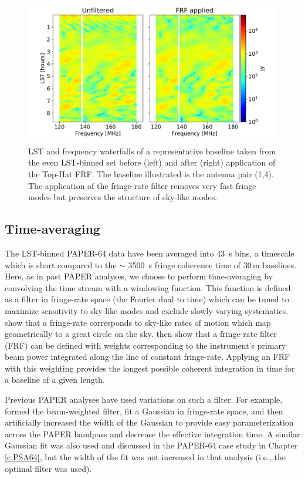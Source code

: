 \begin{figure}[tp]
\centering
\includegraphics[width=.85\textwidth]{plots/data_bl_waterfalls.pdf}
\caption{LST and frequency waterfalls of a representative
baseline taken from the even LST-binned set before (left)
and after (right) application of the Top-Hat FRF.
The baseline illustrated is the antenna pair (1,4). The application of the fringe-rate filter removes very fast
fringe modes but preserves the structure of sky-like
modes.}
\label{fig:waterfalls}
\end{figure}

\subsection{Time-averaging}

The LST-binned PAPER-64 data have been averaged into $43$~s bins, a timescale
which is short compared to the $\sim$ 3500~s fringe coherence time of 30\,m baselines.
Here, as in past PAPER analyses, we choose to perform time-averaging by convolving the time stream with a windowing function.
This function is defined as a filter in fringe-rate space
(the Fourier dual to time) which can be tuned to maximize sensitivity to sky-like modes and exclude slowly varying systematics.
\cite{parsons_backer2009} show that
a fringe-rate corresponds to sky-like rates of motion which map geometrically to
a great circle on the sky.
\cite{parsons_et_al2016} then show that a fringe-rate filter (FRF) can be defined with weights corresponding
to the instrument's primary beam power integrated along the line of constant fringe-rate. Applying an FRF with this weighting provides the longest possible coherent integration in time for a baseline of a given length.

Previous PAPER analyses have used variations on such a filter.  For example, 
formed the beam-weighted filter, fit a Gaussian
in fringe-rate space, and then artificially increased
the width of the Gaussian
to provide easy parameterization across the PAPER
bandpass and decrease the effective integration time.
A similar Gaussian fit was
also used and discussed in the PAPER-64 case study in Chapter \ref{c.PSA64},
but the width of the fit was not increased in that
analysis (i.e., the optimal filter was used).

